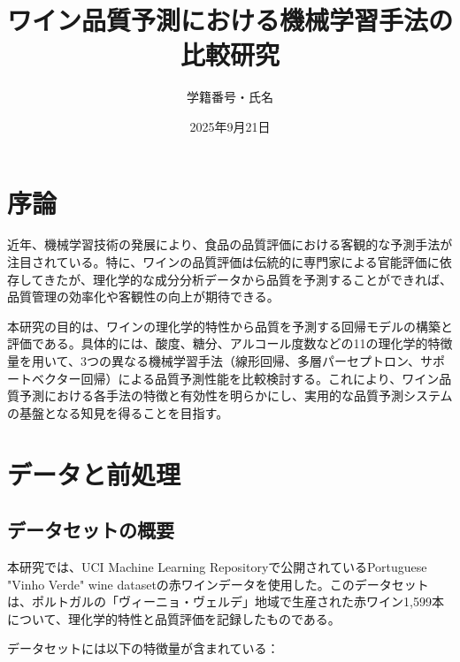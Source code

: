 \documentclass[12pt,a4paper,dvipdfmx]{jsarticle}
\title{ワイン品質予測における機械学習手法の比較研究}
\author{学籍番号・氏名}
\date{2025年9月21日}
\begin{document}
\maketitle

\section{序論}

近年、機械学習技術の発展により、食品の品質評価における客観的な予測手法が注目されている。特に、ワインの品質評価は伝統的に専門家による官能評価に依存してきたが、理化学的な成分分析データから品質を予測することができれば、品質管理の効率化や客観性の向上が期待できる。

本研究の目的は、ワインの理化学的特性から品質を予測する回帰モデルの構築と評価である。具体的には、酸度、糖分、アルコール度数などの11の理化学的特徴量を用いて、3つの異なる機械学習手法（線形回帰、多層パーセプトロン、サポートベクター回帰）による品質予測性能を比較検討する。これにより、ワイン品質予測における各手法の特徴と有効性を明らかにし、実用的な品質予測システムの基盤となる知見を得ることを目指す。

\section{データと前処理}

\subsection{データセットの概要}

本研究では、UCI Machine Learning Repositoryで公開されているPortuguese "Vinho Verde" wine datasetの赤ワインデータを使用した。このデータセットは、ポルトガルの「ヴィーニョ・ヴェルデ」地域で生産された赤ワイン1,599本について、理化学的特性と品質評価を記録したものである。

データセットには以下の特徴量が含まれている：
\end{document}
